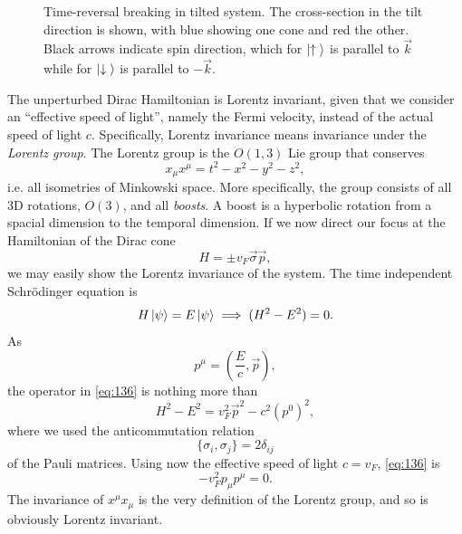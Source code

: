 \begin{figure}[h]
  \centering
  \caption{Time-reversal breaking in tilted system.
    The cross-section in the tilt direction is shown, with blue showing one cone and red the other.
    Black arrows indicate spin direction, which for \(\ket{\uparrow {}}\) is parallel to  \(\vec{k}\) while for \(\ket{\downarrow {}}\) is parallel to \( -\vec{k} \).
    \label{fig:spin-struct-tilt}
  }
\end{figure}

The unperturbed Dirac Hamiltonian is Lorentz invariant, given that we consider an ``effective speed of light'', namely the Fermi velocity, instead of the actual speed of light \( c \).
Specifically, Lorentz invariance means invariance under the \emph{Lorentz group}.
The Lorentz group is the \( O(1,3) \) Lie group that conserves
\[
x_{\mu } x^{\mu } = t^2 - x^2 - y^2 - z^2,
\]
i.e. all isometries of Minkowski space.
More specifically, the group consists of all 3D rotations, \( O(3) \), and all \emph{boosts}.
A boost is a hyperbolic rotation from a spacial dimension to the temporal dimension.
If we now direct our focus at the Hamiltonian of the Dirac cone
\[
H = \pm v_{F} \vec{\sigma} \vec{p},
\]
we may easily show the Lorentz invariance of the system.
The time independent Schrödinger equation is
\begin{equation}
  \label{eq:136}
  H \ket{\psi } = E \ket{\psi } \implies (H^2 - E^2) = 0.
\end{equation}
As
\[
p^{\mu } = \left(\frac{E}{c}, \vec{p}\right),
\]
the operator in \cref{eq:136} is nothing more than
\begin{equation}
  \label{eq:137}
  H^2-E^2 = v_{F}^2 \vec{p}^2 - c^2 \left(p^0\right)^2 ,
\end{equation}
where we used the anticommutation relation
\[
\{\sigma_{i}, \sigma_{j}\} =  2 \delta _{ij}
\]
of the Pauli matrices.
Using now the effective speed of light \( c=v_F \), \cref{eq:136} is
\begin{equation}
  \label{eq:138}
  - v_F^2 p_{\mu } p^{\mu } = 0.
\end{equation}
The invariance of \( x^{\mu} x_{\mu} \) is the very definition of the Lorentz group, and so is obviously Lorentz invariant.

